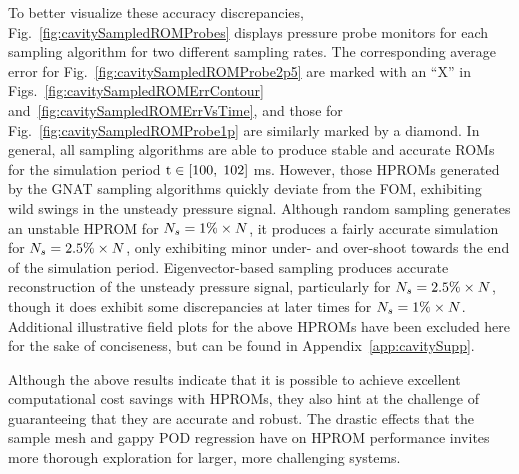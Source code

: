 To better visualize these accuracy discrepancies, Fig.~\ref{fig:cavitySampledROMProbes} displays pressure probe monitors for each sampling algorithm for two different sampling rates. The corresponding average error for Fig.~\ref{fig:cavitySampledROMProbe2p5} are marked with an ``X'' in Figs.~\ref{fig:cavitySampledROMErrContour} and~\ref{fig:cavitySampledROMErrVsTime}, and those for Fig.~\ref{fig:cavitySampledROMProbe1p} are similarly marked by a diamond. In general, all sampling algorithms are able to produce stable and accurate ROMs for the simulation period $\text{t} \in [100, \; 102]$ ms. However, those HPROMs generated by the GNAT sampling algorithms quickly deviate from the FOM, exhibiting wild swings in the unsteady pressure signal. Although random sampling generates an unstable HPROM for $N_s = 1\% \times N$, it produces a fairly accurate simulation for $N_s = 2.5\% \times N$, only exhibiting minor under- and over-shoot towards the end of the simulation period. Eigenvector-based sampling produces accurate reconstruction of the unsteady pressure signal, particularly for $N_s = 2.5\% \times N$, though it does exhibit some discrepancies at later times for $N_s = 1\% \times N$. Additional illustrative field plots for the above HPROMs have been excluded here for the sake of conciseness, but can be found in Appendix~\ref{app:cavitySupp}.

Although the above results indicate that it is possible to achieve excellent computational cost savings with HPROMs, they also hint at the challenge of guaranteeing that they are accurate and robust. The drastic effects that the sample mesh and gappy POD regression have on HPROM performance invites more thorough exploration for larger, more challenging systems.